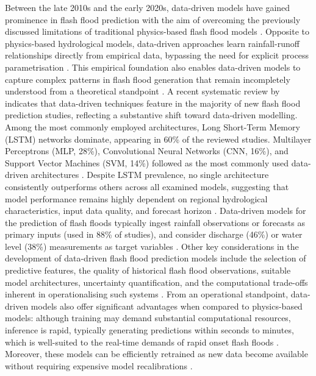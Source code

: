 Between  the late 2010s and the early 2020s, data-driven models have gained prominence in flash flood prediction with the aim of overcoming the previously discussed limitations of traditional physics-based flash flood models \citep{Mosavi_2018, AlRawas_2024, Byaruhanga_2024}. Opposite to physics-based hydrological models, data-driven approaches learn rainfall-runoff relationships directly from empirical data, bypassing the need for explicit process parametrisation \citep{Chang_2018, Zhang_2018}. This empirical foundation also enables data-driven models to capture complex patterns in flash flood generation that remain incompletely understood from a theoretical standpoint \citep{Sun_2019}. A recent systematic review by \citet{Santos_2025} indicates that data-driven techniques feature in the majority of new flash flood prediction studies, reflecting a substantive shift toward data-driven modelling. Among the most commonly employed architectures, Long Short-Term Memory (LSTM) networks dominate, appearing in 60\% of the reviewed studies. Multilayer Perceptrons (MLP, 28\%), Convolutional Neural Networks (CNN, 16\%), and Support Vector Machines (SVM, 14\%) followed as the most commonly used data-driven architectures \citep{Santos_2025}. Despite LSTM prevalence, no single architecture consistently outperforms others across all examined models, suggesting that model performance remains highly dependent on regional hydrological characteristics, input data quality, and forecast horizon \citep{Santos_2025}. Data-driven models for the prediction of flash floods typically ingest rainfall observations or forecasts as primary inputs (used in 88\% of studies), and consider discharge (46\%) or water level (38\%) measurements as target variables \citep{Santos_2025}. Other key considerations in the development of data-driven flash flood prediction models include the selection of predictive features, the quality of historical flash flood observations, suitable model architectures, uncertainty quantification, and the computational trade-offs inherent in operationalising such systems \citep{Santos_2025}. From an operational standpoint, data-driven models also offer significant advantages when compared to physics-based models: although training may demand substantial computational resources, inference is rapid, typically generating predictions within seconds to minutes, which is well-suited to the real-time demands of rapid onset flash floods \citep{Guo_2021, Liao_2023}. Moreover, these models can be efficiently retrained as new data become available without requiring expensive model recalibrations \citep{Zhou_2025}. 

